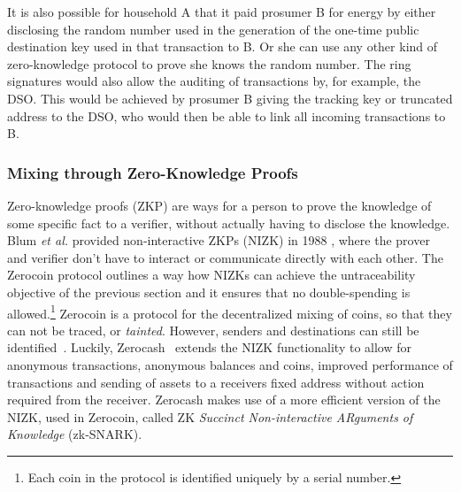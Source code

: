 It is also possible for household A that it paid prosumer B for energy by either disclosing the random number used in the generation of the one-time public destination key used in that transaction to B. Or she can use any other kind of zero-knowledge protocol to prove she knows the random number. The ring signatures would also allow the auditing of transactions by, for example, the DSO. This would be achieved by prosumer B giving the tracking key or truncated address to the DSO, who would then be able to link all incoming transactions to B.

\subsubsection{Mixing through Zero-Knowledge Proofs}
Zero-knowledge proofs (ZKP) are ways for a person to prove the knowledge of some specific fact to a verifier, without actually having to disclose the knowledge. Blum \textit{et al.} provided non-interactive ZKPs (NIZK) in 1988 \cite{Blum:1988:NZA:62212.62222}, where the prover and verifier don't have to interact or communicate directly with each other. The Zerocoin protocol \cite{miers2013zerocoin} outlines a way how NIZKs can achieve the untraceability objective of the previous section and it ensures that no double-spending is allowed.\footnote{Each coin in the protocol is identified uniquely by a serial number.} Zerocoin is a protocol for the decentralized mixing of coins, so that they can not be traced, or \textit{tainted}. However, senders and destinations can still be identified~\cite{miers2013zerocoin}.  Luckily, Zerocash~\cite{Sasson:2014:ZDA:2650286.2650810} extends the NIZK functionality to allow for anonymous transactions, anonymous balances and coins, improved performance of transactions and sending of assets to a receivers fixed address without action required from the receiver. Zerocash makes use of a more efficient version of the NIZK, used in Zerocoin, called ZK \textit{Succinct Non-interactive ARguments of Knowledge} (zk-SNARK). 

